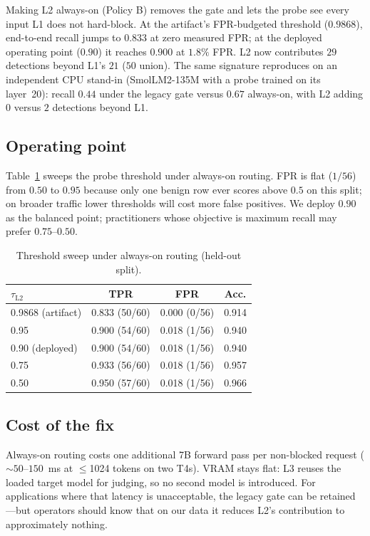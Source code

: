 \documentclass[conference]{IEEEtran}
\begin{document}
Making L2 always-on (Policy B) removes the gate and lets the probe see every
input L1 does not hard-block. At the artifact's FPR-budgeted threshold
($0.9868$), end-to-end recall jumps to $0.833$ at zero measured FPR; at the
deployed operating point ($0.90$) it reaches $0.900$ at $1.8\%$ FPR. L2 now
contributes $29$ detections beyond L1's $21$ ($50$ union). The same signature
reproduces on an independent CPU stand-in (SmolLM2-135M with a probe trained on
its layer~20): recall $0.44$ under the legacy gate versus $0.67$ always-on,
with L2 adding $0$ versus $2$ detections beyond L1.

\subsection{Operating point}
\label{sec:opoint}
Table~\ref{tab:sweep} sweeps the probe threshold under always-on routing. FPR
is flat ($1/56$) from $0.50$ to $0.95$ because only one benign row ever scores
above $0.5$ on this split; on broader traffic lower thresholds will cost more
false positives. We deploy $0.90$ as the balanced point; practitioners whose
objective is maximum recall may prefer $0.75$--$0.50$.

\begin{table}[!t]
\caption{Threshold sweep under always-on routing (held-out split).}
\label{tab:sweep}
\centering
\begin{tabular}{@{}l c c c@{}}
\toprule
$\tau_{\text{L2}}$ & \textbf{TPR} & \textbf{FPR} & \textbf{Acc.}\\
\midrule
0.9868 (artifact) & 0.833 (50/60) & 0.000 (0/56) & 0.914\\
0.95 & 0.900 (54/60) & 0.018 (1/56) & 0.940\\
0.90 (deployed) & 0.900 (54/60) & 0.018 (1/56) & 0.940\\
0.75 & 0.933 (56/60) & 0.018 (1/56) & 0.957\\
0.50 & 0.950 (57/60) & 0.018 (1/56) & 0.966\\
\bottomrule
\end{tabular}
\end{table}

\subsection{Cost of the fix}
\label{sec:cost}
Always-on routing costs one additional 7B forward pass per non-blocked request
(${\sim}50$--$150$~ms at $\le$1024 tokens on two T4s). VRAM stays flat: L3
reuses the loaded target model for judging, so no second model is introduced.
For applications where that latency is unacceptable, the legacy gate can be
retained---but operators should know that on our data it reduces L2's
contribution to approximately nothing.
\end{document}
